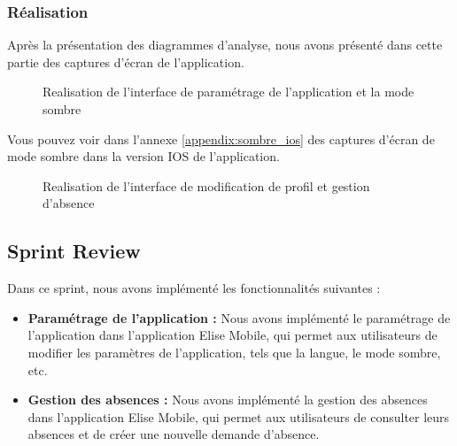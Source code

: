 \subsubsection{Réalisation}

Après la présentation des diagrammes d'analyse, nous avons présenté dans cette partie des captures d'écran de l'application.
\begin{figure}[H]
  \centering
  \caption{Realisation de l'interface de paramétrage de l'application et la mode sombre}
  \label{fig:RealisationInterfaceParametrage}
\end{figure}

Vous pouvez voir dans l'annexe \ref{appendix:sombre_ios} des captures d'écran de mode sombre dans la version IOS de l'application.

\begin{figure}[H]
  \centering
  \caption{Realisation de l'interface de modification de profil et gestion d'absence}
  \label{fig:RealisationInterfaceModificationProfil}
\end{figure}

\subsection{Sprint Review}
Dans ce sprint, nous avons implémenté les fonctionnalités suivantes :
\begin{itemize}
  \item \textbf{Paramétrage de l'application :} Nous avons implémenté le paramétrage de l'application dans l'application Elise Mobile, qui permet aux utilisateurs de modifier les paramètres de l'application, tels que la langue, le mode sombre, etc.\\
  \item \textbf{Gestion des absences :} Nous avons implémenté la gestion des absences dans l'application Elise Mobile, qui permet aux utilisateurs de consulter leurs absences et de créer une nouvelle demande d'absence.\\
\end{itemize}
